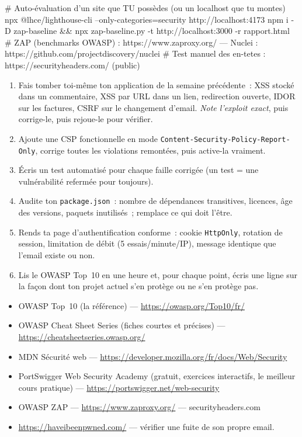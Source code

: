 \begin{terminal}
# Auto-\'evaluation d'un site que TU poss\`edes (ou un localhost que tu montes)
npx @lhce/lighthouse-cli --only-categories=security http://localhost:4173
npm i -D zap-baseline && npx zap-baseline.py -t http://localhost:3000 -r rapport.html
# ZAP (benchmarks OWASP) : https://www.zaproxy.org/   ---   Nuclei : https://github.com/projectdiscovery/nuclei
# Test manuel des en-tetes : https://securityheaders.com/  (public)
\end{terminal}

\begin{exercice}
\begin{enumerate}
  \item Fais tomber toi-m\^eme ton application de la semaine pr\'ec\'edente~: XSS stock\'e dans un
        commentaire, XSS par URL dans un lien, redirection ouverte, IDOR sur les factures,
        CSRF sur le changement d'email. \emph{Note l'exploit exact}, puis corrige-le, puis
        rejoue-le pour v\'erifier.
  \item Ajoute une CSP fonctionnelle en mode \verb|Content-Security-Policy-Report-Only|,
        corrige toutes les violations remont\'ees, puis active-la vraiment.
  \item \'Ecris un test automatis\'e pour chaque faille corrig\'ee (un test = une vuln\'erabilit\'e
        referm\'ee pour toujours).
  \item Audite ton \verb|package.json|~: nombre de d\'ependances transitives, licences, \^age des
        versions, paquets inutilis\'es~; remplace ce qui doit l'\^etre.
  \item Rends ta page d'authentification conforme~: cookie \verb|HttpOnly|, rotation de session,
        limitation de d\'ebit (5 essais/minute/IP), message identique que l'email existe ou non.
  \item Lis le OWASP Top~10 en une heure et, pour chaque point, \'ecris une ligne sur la fa\c{c}on
        dont ton projet actuel s'en prot\`ege ou ne s'en prot\`ege pas.
\end{enumerate}
\end{exercice}

\begin{ressources}
\begin{itemize}
  \item OWASP Top~10 (la r\'ef\'erence) --- \url{https://owasp.org/Top10/fr/}
  \item OWASP Cheat Sheet Series (fiches courtes et pr\'ecises) --- \url{https://cheatsheetseries.owasp.org/}
  \item MDN S\'ecurit\'e web --- \url{https://developer.mozilla.org/fr/docs/Web/Security}
  \item PortSwigger Web Security Academy (gratuit, exercices interactifs, le meilleur cours pratique) --- \url{https://portswigger.net/web-security}
  \item OWASP ZAP --- \url{https://www.zaproxy.org/} --- securityheaders.com
  \item \url{https://haveibeenpwned.com/} --- v\'erifier une fuite de son propre email.
\end{itemize}
\end{ressources}

